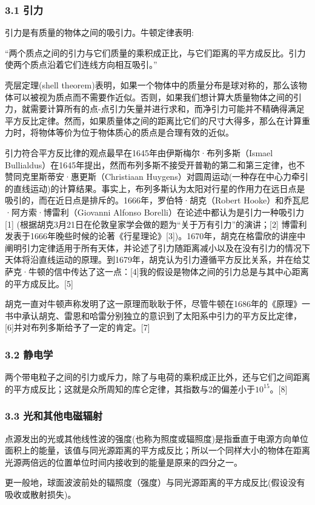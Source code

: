 \subsubsection{3.1 引力}
引力是有质量的物体之间的吸引力。牛顿定律表明:

“两个质点之间的引力与它们质量的乘积成正比，与它们距离的平方成反比。引力使两个质点沿着它们连线方向相互吸引。”

壳层定理(shell theorem)表明，如果一个物体中的质量分布是球对称的，那么该物体可以被视为质点而不需要作近似。否则，如果我们想计算大质量物体之间的引力，就需要计算所有的点-点引力矢量并进行求和，而净引力可能并不精确得满足平方反比定律。然而，如果质量体之间的距离比它们的尺寸大得多，那么在计算重力时，将物体等价为位于物体质心的质点是合理有效的近似。

引力符合平方反比律的观点最早在1645年由伊斯梅尔·布列多斯（Ismael Bullialdus）在1645年提出，然而布列多斯不接受开普勒的第二和第三定律，也不赞同克里斯蒂安·惠更斯（Christiaan Huygens）对圆周运动(一种存在中心力牵引的直线运动)的计算结果。事实上，布列多斯认为太阳对行星的作用力在远日点是吸引的，而在近日点是排斥的。1666年，罗伯特·胡克（Robert Hooke）和乔瓦尼·阿方索·博雷利（Giovanni Alfonso Borelli）在论述中都认为是引力一种吸引力[1] (根据胡克3月21日在伦敦皇家学会做的题为“关于万有引力”的演讲；[2] 博雷利发表于1666年晚些时候的论著《行星理论》[3])。1670年，胡克在格雷欣的讲座中阐明引力定律适用于所有天体，并论述了引力随距离减小以及在没有引力的情况下天体将沿直线运动的原理。到1679年，胡克认为引力遵循平方反比关系，并在给艾萨克·牛顿的信中传达了这一点：[4]我的假设是物体之间的引力总是与其中心距离的平方成反比。[5]

胡克一直对牛顿声称发明了这一原理而耿耿于怀，尽管牛顿在1686年的《原理》一书中承认胡克、雷恩和哈雷分别独立的意识到了太阳系中引力的平方反比定律，[6]并对布列多斯给予了一定的肯定。[7]
\subsubsection{3.2 静电学}
两个带电粒子之间的引力或斥力，除了与电荷的乘积成正比外，还与它们之间距离的平方成反比；这就是众所周知的库仑定律，其指数与2的偏差小于$10^{15}$。[8]
\subsubsection{3.3 光和其他电磁辐射}
点源发出的光或其他线性波的强度(也称为照度或辐照度)是指垂直于电源方向单位面积上的能量，该值与同光源距离的平方成反比；所以一个同样大小的物体在距离光源两倍远的位置单位时间内接收到的能量是原来的四分之一。

更一般地，球面波波前处的辐照度（强度）与同光源距离的平方成反比(假设没有吸收或散射损失)。

